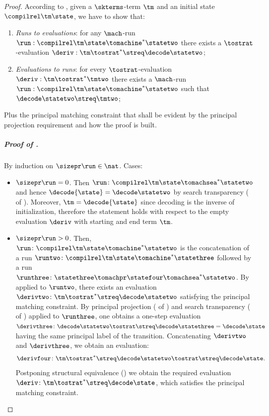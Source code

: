 \begin{proof}
  According to , given a $\skterms$-term $\tm$ and an initial state $\compilrel\tm\state$, we have to show that:
  \begin{enumerate}
   \item \label{p:exec-to-deriv} \emph{Runs to evaluations}: for any $\mach$-run $\run: \compilrel\tm\state \tomachine^* \statetwo$ there exists a 
$\tostrat$-evaluation $\deriv: \tm \tostrat^* \streq\decode\statetwo$;

\item \label{p:deriv-to-exec} \emph{Evaluations to runs}: for every $\tostrat$-evaluation $\deriv: \tm \tostrat^* \tmtwo$ there exists a 
$\mach$-run $\run: \compilrel\tm\state \tomachine^* \statetwo$ such that $\decode\statetwo \streq \tmtwo$;
  \end{enumerate}
  Plus the principal matching constraint that shall be evident by the principal projection requirement and how the proof is built.

  \subparagraph{Proof of .}  By induction on $\sizepr\run \in \nat$. Cases:
  \begin{itemize}
  \item $\sizepr\run = 0$. Then $\run \colon \compilrel\tm\state \tomachsea^* \statetwo$ and hence $\decode{\state} = \decode\statetwo$ by search transparency ( of ).
  Moreover, $\tm = \decode{\state}$ since decoding is the inverse of initialization, therefore the statement holds with respect to the empty evaluation $\deriv$ with starting and end term $\tm$.
  
\item $\sizepr\run > 0$. Then, $\run \colon \compilrel\tm\state \tomachine^* \statetwo$ is the concatenation of a run $\runtwo \colon \compilrel\tm\state \tomachine^* \statethree$ followed by a run $\runthree \colon \statethree \tomachpr \statefour \tomachsea^* \statetwo$.
  By \ih applied to $\runtwo$, there exists an evaluation $\derivtwo \colon \tm \tostrat^* \streq\decode\statetwo$ satisfying the principal matching constraint.
  By principal projection ( of ) and search transparency ( of ) applied to $\runthree$, one obtains a one-step evaluation $\derivthree \colon \decode\statetwo \tostrat \streq\decode\statethree = \decode\state$ having the same principal label of the transition. 
Concatenating $\derivtwo$ and $\derivthree$, we obtain an evaluation:
\[\derivfour \colon \tm  \tostrat^* \streq\decode\statetwo\tostrat \streq\decode\state.\]
Postponing structural equivalence () we obtain the required evaluation $\deriv \colon \tm  \tostrat^* \streq\decode\state$, which satisfies the principal matching constraint.
 \end{itemize}
 

\end{proof}
